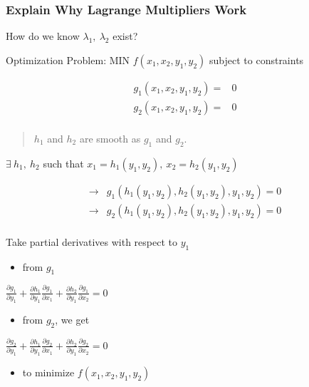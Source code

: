 \documentclass[11pt]{article}
\begin{document}
\subsubsection{Explain Why Lagrange Multipliers Work}
\label{sec:org168311e}

How do we know \(\lambda_1, \ \lambda_2\) exist?

Optimization Problem: MIN \(f (x_1, x_2, y_1, y_2)\) subject to constraints

\begin{equation}
\begin{split}
g_1 (x_1, x_2, y_1, y_2) = & 0\\
g_2 (x_1, x_2, y_1, y_2) = & 0\\
\end{split}
\end{equation}

\begin{quote}
\(h_1\) and \(h_2\) are smooth as \(g_1\) and \(g_2\).
\end{quote}

\(\exists \ h_1, \ h_2\) such that \(x_1 = h_1 (y_1, y_2), \ x_2 = h_2 (y_1, y_2)\)


\begin{equation}
\begin{split}
\to & g_1 (h_1(y_1, y_2), h_2 (y_1, y_2), y_1, y_2) = 0\\
\to & g_2 (h_1(y_1, y_2), h_2 (y_1, y_2), y_1, y_2) = 0\\
\end{split}
\end{equation}

Take partial derivatives with respect to \(y_1\)
\begin{itemize}
\item from \(g_1\)
\end{itemize}

\(\frac{\partial g_1}{\partial y_1} + \frac{\partial h_1}{\partial y_1}
\frac{\partial g_1}{\partial x_1} + \frac{\partial h_2}{\partial y_1} \frac{\partial g_1}{\partial x_2} = 0\)

\begin{itemize}
\item from \(g_2\), we get
\end{itemize}

\(\frac{\partial g_2}{\partial y_1} + \frac{\partial h_1}{\partial y_1}\frac{\partial g_2}{\partial x_1} + \frac{\partial h_2}{\partial y_1} \frac{\partial g_2}{\partial x_2} = 0\)

\begin{itemize}
\item to minimize \(f(x_1, x_2, y_1, y_2)\)
\end{itemize}
\end{document}
